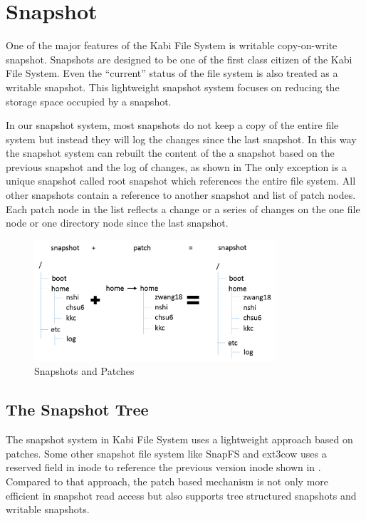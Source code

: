 \chapter{Snapshot}
\label{chap-tour}
    One of the major features of the Kabi File System is writable copy-on-write snapshot. Snapshots are designed to be one of the first class citizen of the Kabi File System. Even the “current” status of the file system is also treated as a writable snapshot. This lightweight snapshot system focuses on reducing the storage space occupied by a snapshot.

    In our snapshot system, most snapshots do not keep a copy of the entire file system but instead they will log the changes since the last snapshot. In this way the snapshot system can rebuilt the content of the a snapshot based on the previous snapshot and the log of changes, as shown in  The only exception is a unique snapshot called root snapshot which references the entire file system. All other snapshots contain a reference to another snapshot and list of patch nodes. Each patch node in the list reflects a change or a series of changes on the one file node or one directory node since the last snapshot.

\begin{figure}[hbtp]
\centering
\includegraphics[width=0.8\textwidth]{Chapter-4/figs/fig23.png}
\caption{Snapshots and Patches}
\label{fig:snapshot_patch}
\end{figure}

\section{The Snapshot Tree}

	The snapshot system in Kabi File System uses a lightweight approach based on patches. Some other snapshot file system like SnapFS and ext3cow uses a reserved field in inode to reference the previous version inode shown in . Compared to that approach, the patch based mechanism is not only more efficient in snapshot read access but also supports tree structured snapshots and writable snapshots.

